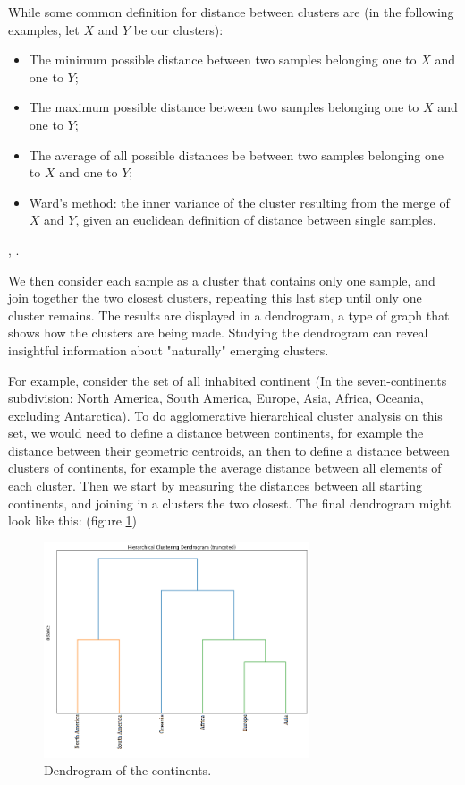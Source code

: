 \documentclass[a4paper]{report}
\begin{document}
While some common definition for distance between clusters are (in the following examples, let $X$ and $Y$ be our clusters):

\begin{itemize}
	\item The minimum possible distance between two samples belonging one to $X$ and one to $Y$;
	\item The maximum possible distance between two samples belonging one to $X$ and one to $Y$;
	\item The average of all possible distances be between two samples belonging one to $X$ and one to $Y$;
	\item Ward's method: the inner variance of the cluster resulting from the merge of $X$ and $Y$, given an euclidean definition of distance between single samples.
\end{itemize}

\cite{CLUSTER}, \cite{rokach2005clustering}.

We then consider each sample as a cluster that contains only one sample, and join together the two closest clusters, repeating this last step until only one cluster remains.
The results are displayed in a dendrogram, a type of graph that shows how the clusters are being made.
Studying the dendrogram can reveal insightful information about "naturally" emerging clusters.

For example, consider the set of all inhabited continent (In the seven-continents subdivision:
North America, South America, Europe, Asia, Africa, Oceania, excluding Antarctica).
To do agglomerative hierarchical cluster analysis on this set, we would need to define a distance between continents, for example the distance between their geometric centroids, an then to define a distance between clusters of continents, for example the average distance between all elements of each cluster.
Then we start by measuring the distances between all starting continents, and joining in a clusters the two closest.
The final dendrogram might look like this:
(figure \ref{conte})


\begin{figure} [H]
\centering
\includegraphics [width=0.7\textwidth] {o/continents.png}
\caption{Dendrogram of the continents.}
\label{conte}
\end{figure}
\end{document}
